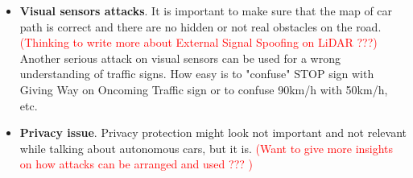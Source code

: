 \begin{itemize}
	\item \textbf{Visual sensors attacks}. It is important to make sure that the map of car path is correct and there are no hidden or not real obstacles on the road. \textcolor{red}{(Thinking to write more about External Signal Spoofing on \gls{LiDAR} ???)}
	Another serious attack on visual sensors can be used for a wrong understanding of traffic signs. How easy is to "confuse" STOP sign with Giving Way on Oncoming Traffic sign or to confuse 90km/h with 50km/h, etc.
	\item \textbf{Privacy issue}. Privacy protection might look not important and not relevant while talking about autonomous cars, but it is. \textcolor{red}{(Want to give more insights on how attacks can be arranged and used ??? )}
\end{itemize}

